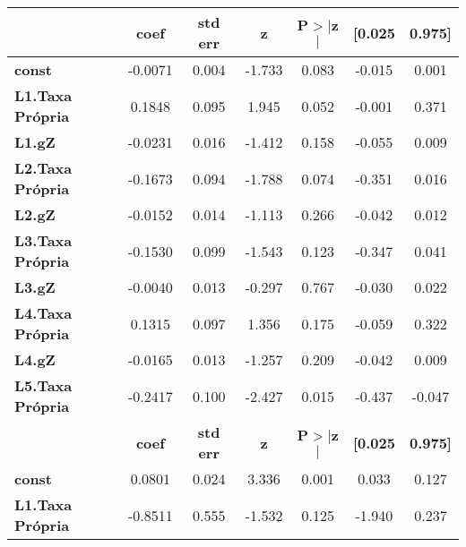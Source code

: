 \begin{center}
\begin{tabular}{lcccccc}
\toprule
                         & \textbf{coef} & \textbf{std err} & \textbf{z} & \textbf{P$> |$z$|$} & \textbf{[0.025} & \textbf{0.975]}  \\
\midrule
\textbf{const}           &      -0.0071  &        0.004     &    -1.733  &         0.083        &       -0.015    &        0.001     \\
\textbf{L1.Taxa Própria} &       0.1848  &        0.095     &     1.945  &         0.052        &       -0.001    &        0.371     \\
\textbf{L1.gZ}           &      -0.0231  &        0.016     &    -1.412  &         0.158        &       -0.055    &        0.009     \\
\textbf{L2.Taxa Própria} &      -0.1673  &        0.094     &    -1.788  &         0.074        &       -0.351    &        0.016     \\
\textbf{L2.gZ}           &      -0.0152  &        0.014     &    -1.113  &         0.266        &       -0.042    &        0.012     \\
\textbf{L3.Taxa Própria} &      -0.1530  &        0.099     &    -1.543  &         0.123        &       -0.347    &        0.041     \\
\textbf{L3.gZ}           &      -0.0040  &        0.013     &    -0.297  &         0.767        &       -0.030    &        0.022     \\
\textbf{L4.Taxa Própria} &       0.1315  &        0.097     &     1.356  &         0.175        &       -0.059    &        0.322     \\
\textbf{L4.gZ}           &      -0.0165  &        0.013     &    -1.257  &         0.209        &       -0.042    &        0.009     \\
\textbf{L5.Taxa Própria} &      -0.2417  &        0.100     &    -2.427  &         0.015        &       -0.437    &       -0.047     \\
                         & \textbf{coef} & \textbf{std err} & \textbf{z} & \textbf{P$> |$z$|$} & \textbf{[0.025} & \textbf{0.975]}  \\
\midrule
\textbf{const}           &       0.0801  &        0.024     &     3.336  &         0.001        &        0.033    &        0.127     \\
\textbf{L1.Taxa Própria} &      -0.8511  &        0.555     &    -1.532  &         0.125        &       -1.940    &        0.237     \\

\end{tabular}
\end{center}
